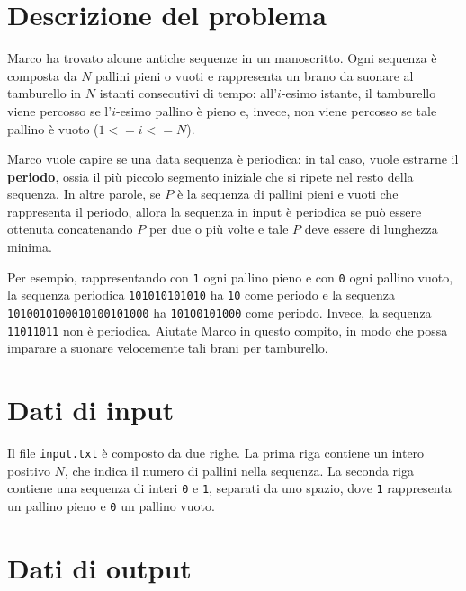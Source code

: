 \documentclass[a4paper,11pt]{article}
\begin{document}
\vspace{0.5cm}



\vspace{0.5cm}

\section*{Descrizione del problema}
   
Marco ha trovato alcune antiche sequenze in un manoscritto. Ogni
sequenza è composta da $N$ pallini pieni o vuoti e
rappresenta un brano da suonare al tamburello in $N$ istanti
consecutivi di tempo: all'$i$-esimo istante, il tamburello
viene percosso se l'$i$-esimo pallino è pieno e, invece,
non viene percosso se tale pallino è vuoto ($1 <= i <= N$).

Marco vuole capire se una data sequenza è periodica: in tal
caso, vuole estrarne il \textbf{periodo}, ossia il più piccolo segmento
iniziale che si ripete nel resto della sequenza. In altre parole,
se $P$ è la sequenza di pallini pieni e vuoti che rappresenta il periodo,
allora la sequenza in input è periodica se può essere ottenuta
concatenando $P$ per due o più volte e tale $P$
deve essere di lunghezza minima.

Per esempio, rappresentando con \texttt{1} ogni pallino pieno
e con \texttt{0} ogni pallino vuoto, la sequenza periodica
\texttt{101010101010} ha \texttt{10} come periodo e la
sequenza \texttt{1010010100010100101000}
ha \texttt{10100101000} come periodo. Invece, la
sequenza \texttt{11011011} non è periodica. Aiutate
Marco in questo compito, in modo che possa imparare a suonare
velocemente tali brani per tamburello.


\section*{Dati di input}
  
Il file \texttt{input.txt} è composto da due righe.  La prima
riga contiene un intero positivo $N$, che indica il numero di pallini
nella sequenza. La seconda riga contiene una sequenza di
interi \texttt{0} e \texttt{1}, separati da uno spazio,
dove \texttt{1} rappresenta un pallino pieno e \texttt{0}
un pallino vuoto.


\section*{Dati di output}
  
\end{document}
